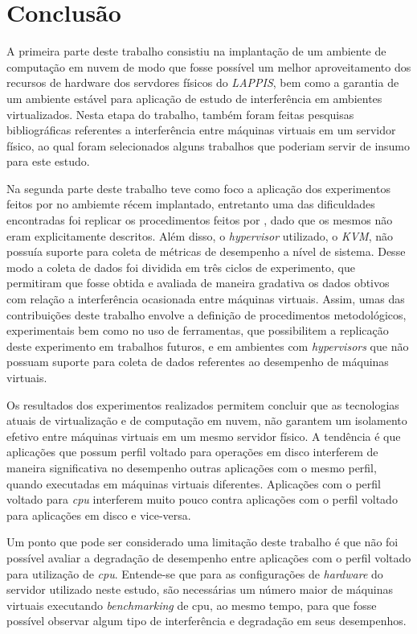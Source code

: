 \chapter{Conclusão}
\label{cap:conclusao}

A primeira parte deste trabalho consistiu na implantação de um ambiente de computação em nuvem de modo que fosse possível um melhor aproveitamento dos recursos de hardware dos servdores físicos do \textit{LAPPIS}, bem como a garantia de um ambiente estável para aplicação de estudo de interferência em ambientes virtualizados. Nesta etapa do trabalho, também foram feitas pesquisas bibliográficas referentes a interferência entre máquinas virtuais em um servidor físico, ao qual foram selecionados alguns trabalhos que poderiam servir de insumo para este estudo.

Na segunda parte deste trabalho teve como foco a aplicação dos experimentos feitos por  no ambiemte récem implantado, entretanto uma das dificuldades encontradas foi replicar os procedimentos feitos por , dado que os mesmos não eram explicitamente descritos. Além disso, o \textit{hypervisor} utilizado, o \textit{KVM}, não possuía suporte para coleta de métricas de desempenho a nível de sistema. Desse modo a coleta de dados foi dividida em três ciclos de experimento, que permitiram que fosse obtida e avaliada de maneira gradativa os dados obtivos com relação a interferência ocasionada entre máquinas virtuais. Assim, umas das contribuições deste trabalho envolve a definição de procedimentos metodológicos, experimentais bem como no uso de ferramentas, que possibilitem a replicação deste experimento em trabalhos futuros, e em ambientes com \textit{hypervisors} que não possuam suporte para coleta de dados referentes ao desempenho de máquinas virtuais.  %

Os resultados dos experimentos realizados permitem concluir que as tecnologias atuais de virtualização e de computação em nuvem, não garantem um isolamento efetivo entre máquinas virtuais em um mesmo servidor físico. A tendência é que aplicações que possum perfil voltado para operações em disco interferem de maneira significativa no desempenho outras aplicações  com o mesmo perfil, quando executadas em máquinas virtuais diferentes. Aplicações com o perfil voltado para \textit{cpu} interferem muito pouco contra aplicações com o perfil voltado para aplicações em disco e vice-versa.

Um ponto que pode ser considerado uma limitação deste trabalho é que não foi possível avaliar a degradação de desempenho entre aplicações com o perfil voltado para utilização de \textit{cpu}. Entende-se que para as configurações de \textit{hardware} do servidor utilizado neste estudo, são necessárias um número maior de máquinas virtuais executando \textit{benchmarking} de cpu, ao mesmo tempo, para que fosse possível observar algum tipo de interferência e degradação em seus desempenhos.

